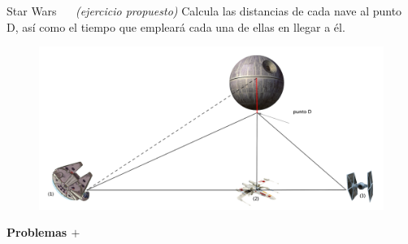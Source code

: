 \begin{myexampleblock}{Star Wars $\quad$ \emph{(ejercicio propuesto)} }
Calcula las distancias de cada nave al punto D, así como el tiempo que empleará cada una de ellas en llegar a él.

	\begin{figure}[H]
	\centering
	\includegraphics[width=1\textwidth]{img-triang/sw0.png}
\end{figure}

\begin{flushright}
\begin{footnotesize} \textcolor{gris}{}	\end{footnotesize}
\end{flushright}	
\end{myexampleblock}






\newpage
\vspace{1cm}
\begin{adjustwidth}{50pt}{250pt}
\begin{cuadro-naranja}
\textbf{\huge{Problemas $\boldsymbol{+}$}}\normalsize{$\, $}
\end{cuadro-naranja}	
\end{adjustwidth}

